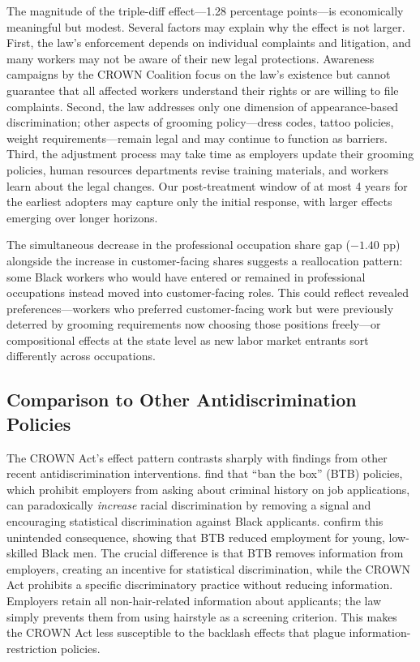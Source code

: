 \documentclass[12pt]{article}
\begin{document}
The magnitude of the triple-diff effect---1.28 percentage points---is economically meaningful but modest. Several factors may explain why the effect is not larger. First, the law's enforcement depends on individual complaints and litigation, and many workers may not be aware of their new legal protections. Awareness campaigns by the CROWN Coalition focus on the law's existence but cannot guarantee that all affected workers understand their rights or are willing to file complaints. Second, the law addresses only one dimension of appearance-based discrimination; other aspects of grooming policy---dress codes, tattoo policies, weight requirements---remain legal and may continue to function as barriers. Third, the adjustment process may take time as employers update their grooming policies, human resources departments revise training materials, and workers learn about the legal changes. Our post-treatment window of at most 4 years for the earliest adopters may capture only the initial response, with larger effects emerging over longer horizons.

The simultaneous decrease in the professional occupation share gap ($-1.40$ pp) alongside the increase in customer-facing shares suggests a reallocation pattern: some Black workers who would have entered or remained in professional occupations instead moved into customer-facing roles. This could reflect revealed preferences---workers who preferred customer-facing work but were previously deterred by grooming requirements now choosing those positions freely---or compositional effects at the state level as new labor market entrants sort differently across occupations.

\subsection{Comparison to Other Antidiscrimination Policies}

The CROWN Act's effect pattern contrasts sharply with findings from other recent antidiscrimination interventions. \citet{agan2018} find that ``ban the box'' (BTB) policies, which prohibit employers from asking about criminal history on job applications, can paradoxically \textit{increase} racial discrimination by removing a signal and encouraging statistical discrimination against Black applicants. \citet{doleac2020} confirm this unintended consequence, showing that BTB reduced employment for young, low-skilled Black men. The crucial difference is that BTB removes information from employers, creating an incentive for statistical discrimination, while the CROWN Act prohibits a specific discriminatory practice without reducing information. Employers retain all non-hair-related information about applicants; the law simply prevents them from using hairstyle as a screening criterion. This makes the CROWN Act less susceptible to the backlash effects that plague information-restriction policies.
\end{document}
